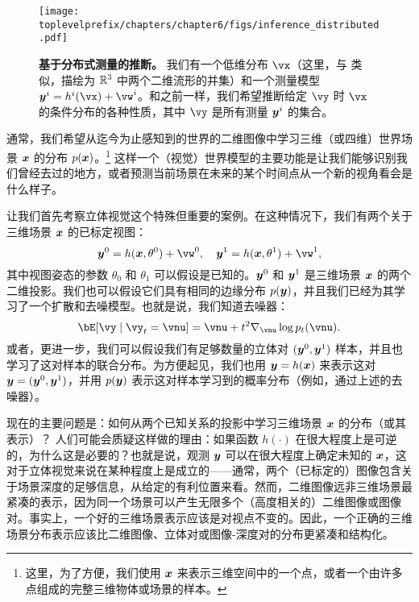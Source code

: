 \documentclass[../../book-main_zh.tex]{subfiles}
\begin{document}
\begin{figure}[t]
  \centering 
  \texttt{[image: \\toplevelprefix/chapters/chapter6/figs/inference\_distributed.pdf]}
  \caption{\small \textbf{基于分布式测量的推断。} 我们有一个低维分布 \(\vx\)（这里，与  类似，描绘为 \(\mathbb{R}^{3}\) 中两个二维流形的并集）和一个测量模型 \(\y^{i} = h^{i}(\vx) + \vw^{i}\)。和之前一样，我们希望推断给定 \(\vy\) 时 \(\vx\) 的条件分布的各种性质，其中 \(\vy\) 是所有测量 \(\bm{y}^{i}\) 的集合。}
  \label{fig:inference_distributed}
\end{figure}

通常，我们希望从迄今为止感知到的世界的二维图像中学习三维（或四维）世界场景 $\bm{x}$ 的分布 $p(\bm{x})$。\footnote{这里，为了方便，我们使用 $\bm{x}$ 来表示三维空间中的一个点，或者一个由许多点组成的完整三维物体或场景的样本。} 这样一个（视觉）世界模型的主要功能是让我们能够识别我们曾经去过的地方，或者预测当前场景在未来的某个时间点从一个新的视角看会是什么样子。

让我们首先考察立体视觉这个特殊但重要的案例。在这种情况下，我们有两个关于三维场景 $\bm{x}$ 的已标定视图：
\begin{equation}
    \y^0 = h(\x, \theta^0) +\vw^0, \quad \y^1 = h(\x, \theta^1) +\vw^1, 
\end{equation}
其中视图姿态的参数 $\theta_0$ 和 $\theta_1$ 可以假设是已知的。$\bm{y}^0$ 和 $\bm{y}^1$ 是三维场景 $\bm{x}$ 的两个二维投影。我们也可以假设它们具有相同的边缘分布 $p(\bm{y})$，并且我们已经为其学习了一个扩散和去噪模型。也就是说，我们知道去噪器：
\begin{equation}
  \bE[\vy \mid \vy_t=\vnu] =
  \vnu + t^2 \nabla_{\vnu}\log p_t(\vnu). 
 \label{eq:y-posterior-sampling-denoiser}    
\end{equation}
或者，更进一步，我们可以假设我们有足够数量的立体对 $(\bm{y}^0, \bm{y}^1)$ 样本，并且也学习了这对样本的联合分布。为方便起见，我们也用 $\bm{y} = h(\bm{x})$ 来表示这对 $\bm{y} = (\bm{y}^0, \bm{y}^1)$，并用 $p(\bm{y})$ 表示这对样本学习到的概率分布（例如，通过上述的去噪器）。

现在的主要问题是：如何从两个已知关系的投影中学习三维场景 $\bm{x}$ 的分布（或其表示）？
人们可能会质疑这样做的理由：如果函数 $h(\cdot)$ 在很大程度上是可逆的，为什么这是必要的？也就是说，观测 $\bm{y}$ 可以在很大程度上确定未知的 $\bm{x}$，这对于立体视觉来说在某种程度上是成立的——通常，两个（已标定的）图像包含关于场景深度的足够信息，从给定的有利位置来看。然而，二维图像远非三维场景最紧凑的表示，因为同一个场景可以产生无限多个（高度相关的）二维图像或图像对。事实上，一个好的三维场景表示应该是对视点不变的。因此，一个正确的三维场景分布表示应该比二维图像、立体对或图像-深度对的分布更紧凑和结构化。
\end{document}
